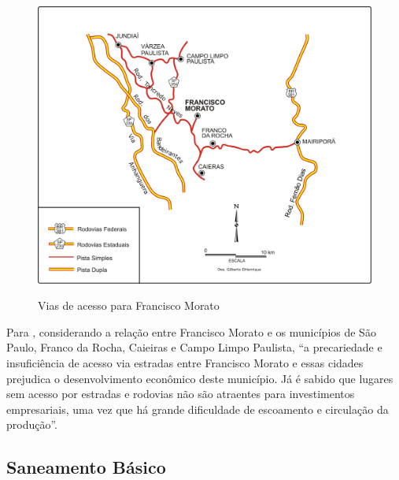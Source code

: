 	\begin{figure}[!htb]
		\centering
		\caption{Vias de acesso para Francisco Morato}
		\includegraphics[width=\linewidth]{img/cassiele_vias_acesso}
		\label{fig:vias_acesso}
	\end{figure}
	
	Para , considerando a relação entre Francisco Morato e os municípios de São Paulo, Franco da Rocha, Caieiras e Campo	Limpo Paulista, ``a precariedade e insuficiência de acesso via estradas entre Francisco Morato e essas cidades prejudica o desenvolvimento econômico deste município. Já é sabido que lugares sem acesso por estradas e rodovias não são atraentes para investimentos empresariais, uma vez que há grande dificuldade de escoamento e circulação da produção''.
	
	\subsection{Saneamento Básico}
    
%
%

	\postextual
	
	
	
	
	\renewcommand{\glossaryname}{Glossário}
	\renewcommand*{\glsseeformat}[3][\seename]{\textit{#1}
		\glsseelist{#2}}
	
